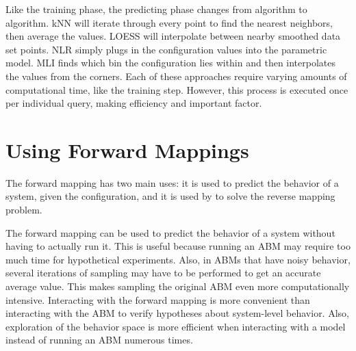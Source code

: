 Like the training phase, the predicting phase changes from algorithm to algorithm.
kNN will iterate through every point to find the nearest neighbors, then average the values.
LOESS will interpolate between nearby smoothed data set points.
NLR simply plugs in the configuration values into the parametric model.
MLI finds which bin the configuration lies within and then interpolates the values from the corners.
Each of these approaches require varying amounts of computational time, like the training step.
However, this process is executed once per individual query, making efficiency and important factor.


\section{Using Forward Mappings}

The forward mapping has two main uses: it is used to predict the behavior of a system, given the configuration, and it is used by \fw to solve the reverse mapping problem.

The forward mapping can be used to predict the behavior of a system without having to actually run it.
This is useful because running an ABM may require too much time for hypothetical experiments.
Also, in ABMs that have noisy behavior, several iterations of sampling may have to be performed to get an accurate average value.
This makes sampling the original ABM even more computationally intensive.
Interacting with the forward mapping is more convenient than interacting with the ABM to verify hypotheses about system-level behavior.
Also, exploration of the behavior space is more efficient when interacting with a model instead of running an ABM numerous times.

